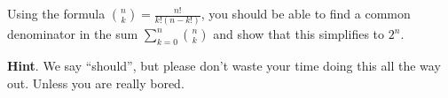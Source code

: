 \documentclass{book}
\begin{document}
\setcounter{cpjt}{76}
\addtocounter{cpjt}{-1}
\begin{activity}\label{act-pascalrowsum-alg}
\hypertarget{p-574}{}%
Using the formula \(\binom{n}{k} = \frac{n!}{k!(n-k!)}\), you should be able to find a common denominator in the sum \(\sum_{k=0}^n \binom{n}{k}\) and show that this simplifies to \(2^n\).%
\par\smallskip%
\noindent\textbf{Hint}.\hypertarget{hint-32}{}\quad%
\hypertarget{p-575}{}%
We say ``should'', but please don't waste your time doing this all the way out.  Unless you are really bored.%
\end{activity}

\clearpage
\end{document}
